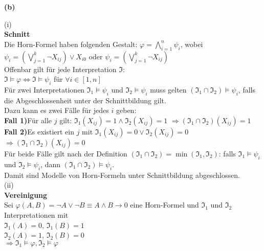 \documentclass[11pt, a4paper]{article}
\begin{document}
\textbf{(b)}
\begin{adjustwidth}{20pt}{20pt}
(i)\\
\textbf{Schnitt}\\
Die Horn-Formel haben folgenden Gestalt: $\varphi = \bigwedge \limits_{i=1}^n \psi_i$, wobei $\psi_i= (\bigvee \limits_{j=1}^k\neg X_{ij}) \vee X_{i0}$ oder $\psi_i= (\bigvee \limits_{j=1}^k\neg X_{ij})$\\

Offenbar gilt für jede Interpretation $\mathfrak{I}$:\\

$\mathfrak{I} \models \varphi \Leftrightarrow \mathfrak{I} \models \psi_i$ für $\forall i \in [1,n]$\\

Für zwei Interpretationen $\mathfrak{I_1} \models \psi_i$ und $\mathfrak{I_2} \models \psi_i$ muss  gelten $(\mathfrak{I_1} \cap \mathfrak{I_2}) \models \psi_i$, falls die Abgeschlossenheit unter der Schnittbildung gilt.\\

Dazu kann es zwei Fälle für jedes $i$ geben:\\
\textbf{Fall 1)}Für alle $j$ gilt: $\mathfrak{I_1}(X_{ij})=1 \wedge \mathfrak{I_2}(X_{ij})=1$  \hspace*{45 pt} $\Rightarrow (\mathfrak{I_1} \cap \mathfrak{I_2})(X_{ij})=1$\\
\textbf{Fall 2)}Es existiert ein $j$ mit $\mathfrak{I_1}(X_{ij})=0 \vee \mathfrak{I_2}(X_{ij})=0$ \hspace*{15 pt} $\Rightarrow (\mathfrak{I_1} \cap \mathfrak{I_2})(X_{ij})=0$\\

Für beide Fälle gilt nach der Definition $(\mathfrak{I_1} \cap \mathfrak{I_2}) = \min(\mathfrak{I_1}, \mathfrak{I_2})$: falls $\mathfrak{I_1} \models \psi_i$ und $\mathfrak{I_2} \models \psi_i$, dann $(\mathfrak{I_1} \cap \mathfrak{I_2}) \models \psi_i$.\\

Damit sind Modelle von Horn-Formeln unter Schnittbildung abgeschlossen.\\
(ii)\\
\textbf{Vereinigung}\\
Sei $\varphi(A,B) = \neg A \vee \neg B  \equiv A \wedge B \rightarrow 0$ eine Horn-Formel und $\mathfrak{I_1}$ und $\mathfrak{I_2}$ Interpretationen mit\\
$\mathfrak{I_1}(A)=0$, $\mathfrak{I_1}(B)=1$\\
$\mathfrak{I_2}(A)=1$, $\mathfrak{I_2}(B)=0$\\
$\Rightarrow \mathfrak{I_1} \models \varphi, \mathfrak{I_2} \models \varphi$\\


\end{adjustwidth}
\end{document}
